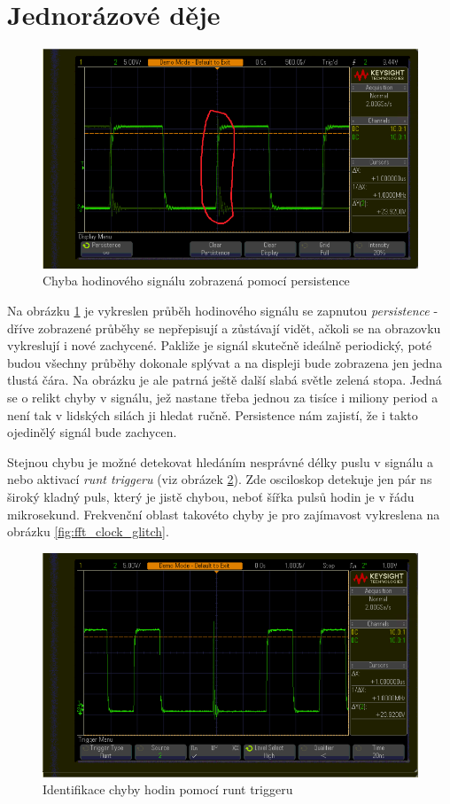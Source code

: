 \documentclass[twoside]{article}
\begin{document}
\section{Jednorázové děje}
\begin{figure}[htbp]
	\centering
	\includegraphics[width=0.8\linewidth]{clock_glitch_persistence.png                    }
	\caption{Chyba hodinového signálu zobrazená pomocí persistence}
	\label{fig:glich_persistence}
\end{figure}
Na obrázku \ref{fig:glich_persistence} je vykreslen průběh hodinového signálu se zapnutou \textit{persistence} -
dříve zobrazené průběhy se nepřepisují a zůstávají vidět, ačkoli se na obrazovku vykreslují i nové zachycené.
Pakliže je signál skutečně ideálně periodický, poté budou všechny průběhy dokonale splývat a na displeji bude zobrazena jen jedna tlustá čára.
Na obrázku je ale patrná ještě další slabá světle zelená stopa. Jedná se o relikt chyby v signálu, jež nastane třeba jednou za tisíce i miliony
period a není tak v lidských silách ji hledat ručně. Persistence nám zajistí, že i takto ojedinělý signál bude zachycen.

Stejnou chybu je možné detekovat hledáním nesprávné délky puslu v signálu a nebo aktivací \textit{runt triggeru} (viz obrázek \ref{fig:glitch_runt}).
Zde osciloskop detekuje jen pár ns široký kladný puls, který je jistě chybou, neboť šířka pulsů hodin je v řádu mikrosekund.
Frekvenční oblast takovéto chyby je pro zajímavost vykreslena na obrázku \ref{fig:fft_clock_glitch}.

\begin{figure}[htbp]
	\centering
	\includegraphics[width=0.8\linewidth]{trigger_runt_clock_glitch.png                    }
	\caption{Identifikace chyby hodin pomocí runt triggeru}
	\label{fig:glitch_runt}
\end{figure}
\end{document}
